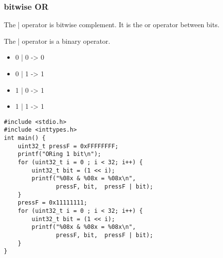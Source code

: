 \documentclass[11pt]{article}
\begin{document}
\subsubsection{bitwise OR}
\label{sec:org4a0d459}

The | operator is bitwise complement. It is the or operator between
bits. 

The | operator is a binary operator.

\begin{itemize}
\item 0 | 0 -> 0
\item 0 | 1 -> 1
\item 1 | 0 -> 1
\item 1 | 1 -> 1
\end{itemize}

\begin{verbatim}
#include <stdio.h>
#include <inttypes.h>
int main() {  
    uint32_t pressF = 0xFFFFFFFF;
    printf("ORing 1 bit\n");
    for (uint32_t i = 0 ; i < 32; i++) {
        uint32_t bit = (1 << i);
        printf("%08x & %08x = %08x\n",
               pressF, bit,  pressF | bit);
    }
    pressF = 0x11111111;
    for (uint32_t i = 0 ; i < 32; i++) {
        uint32_t bit = (1 << i);
        printf("%08x & %08x = %08x\n",
               pressF, bit,  pressF | bit);
    }
}
\end{verbatim}
\end{document}
